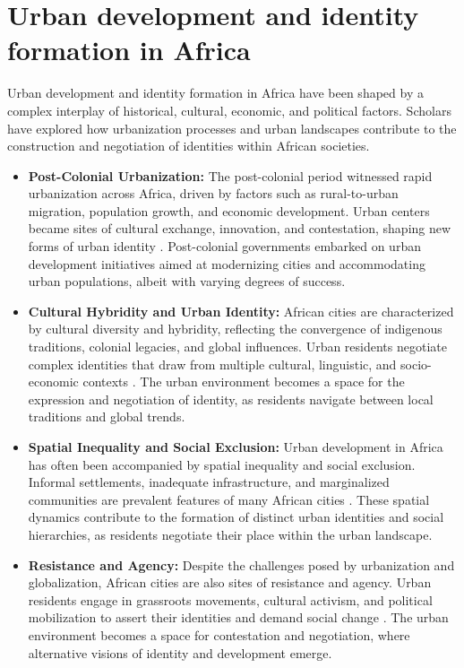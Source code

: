 \section{Urban development and identity formation in Africa}
Urban development and identity formation in Africa have been shaped by a complex interplay of historical, cultural, economic, and political factors. Scholars have explored how urbanization processes and urban landscapes contribute to the construction and negotiation of identities within African societies.
\begin{itemize}
    \item \textbf{Post-Colonial Urbanization:}
    The post-colonial period witnessed rapid urbanization across Africa, driven by factors such as rural-to-urban migration, population growth, and economic development. Urban centers became sites of cultural exchange, innovation, and contestation, shaping new forms of urban identity \cite{Onilude}. Post-colonial governments embarked on urban development initiatives aimed at modernizing cities and accommodating urban populations, albeit with varying degrees of success.
    \item \textbf{Cultural Hybridity and Urban Identity:}
    African cities are characterized by cultural diversity and hybridity, reflecting the convergence of indigenous traditions, colonial legacies, and global influences. Urban residents negotiate complex identities that draw from multiple cultural, linguistic, and socio-economic contexts \cite{Onilude}. The urban environment becomes a space for the expression and negotiation of identity, as residents navigate between local traditions and global trends.
    \item \textbf{Spatial Inequality and Social Exclusion:}
    Urban development in Africa has often been accompanied by spatial inequality and social exclusion. Informal settlements, inadequate infrastructure, and marginalized communities are prevalent features of many African cities \cite{falola2008history}. These spatial dynamics contribute to the formation of distinct urban identities and social hierarchies, as residents negotiate their place within the urban landscape.
    \item \textbf{Resistance and Agency:}
    Despite the challenges posed by urbanization and globalization, African cities are also sites of resistance and agency. Urban residents engage in grassroots movements, cultural activism, and political mobilization to assert their identities and demand social change \cite{Onilude}. The urban environment becomes a space for contestation and negotiation, where alternative visions of identity and development emerge.
\end{itemize}
